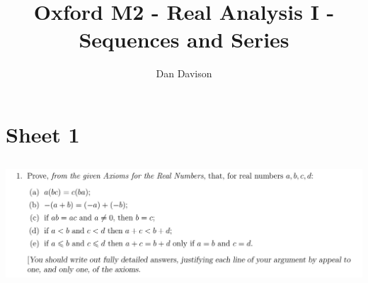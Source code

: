 \documentclass[12pt]{article}
\title{Oxford M2 - Real Analysis I - Sequences and Series
  \footnotetext{\url{https://courses.maths.ox.ac.uk/node/37482}}} \author{Dan Davison}
\author{}
\date{}
\begin{document}
\maketitle
\tableofcontents


\newpage
\section{Sheet 1}

\subsection{}
\begin{mdframed}
\includegraphics[width=400pt]{img/oxford-M2-analysis-I-1-1.png}
\end{mdframed}
\end{document}
